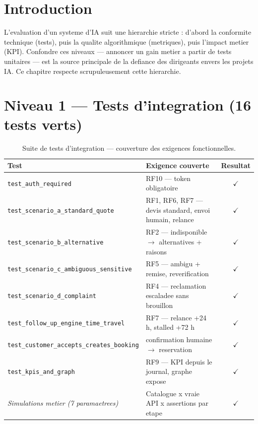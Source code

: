 \documentclass[12pt,a4paper,openany]{report}
\begin{document}
\section{Introduction}
L'evaluation d'un systeme d'IA suit une hierarchie stricte : d'abord la conformite technique (tests), puis la qualite algorithmique (metriques), puis l'impact metier (KPI). Confondre ces niveaux --- annoncer un gain metier a partir de tests unitaires --- est la source principale de la defiance des dirigeants envers les projets IA. Ce chapitre respecte scrupuleusement cette hierarchie.

\section{Niveau 1 --- Tests d'integration (16 tests verts)}

\begin{table}[H]\centering\small
\caption{Suite de tests d'integration --- couverture des exigences fonctionnelles.}
\label{tab:tests}
\begin{tabularx}{\textwidth}{l X c}\toprule
\rowcolor{emsiGreen!30}\textbf{Test} & \textbf{Exigence couverte} & \textbf{Resultat}\\\midrule
\texttt{test\_auth\_required}                & RF10 --- token obligatoire & $\checkmark$\\
\texttt{test\_scenario\_a\_standard\_quote}  & RF1, RF6, RF7 --- devis standard, envoi humain, relance & $\checkmark$\\
\texttt{test\_scenario\_b\_alternative}      & RF2 --- indisponible $\rightarrow$ alternatives + raisons & $\checkmark$\\
\texttt{test\_scenario\_c\_ambiguous\_sensitive} & RF5 --- ambigu + remise, reverification & $\checkmark$\\
\texttt{test\_scenario\_d\_complaint}        & RF4 --- reclamation escaladee sans brouillon & $\checkmark$\\
\texttt{test\_follow\_up\_engine\_time\_travel} & RF7 --- relance +24 h, stalled +72 h & $\checkmark$\\
\texttt{test\_customer\_accepts\_creates\_booking} & confirmation humaine $\rightarrow$ reservation & $\checkmark$\\
\texttt{test\_kpis\_and\_graph}              & RF9 --- KPI depuis le journal, graphe expose & $\checkmark$\\
\emph{Simulations metier (7 paramaetrees)}   & Catalogue x vraie API x assertions par etape & $\checkmark$\\
\bottomrule
\end{tabularx}
\end{table}
\end{document}
